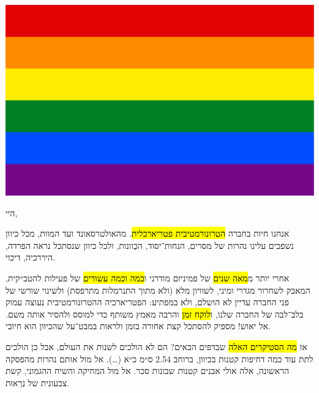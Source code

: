 



\color{magenta}
\setRL{}
\includegraphics[width=\textwidth, height=1ex]{flag.eps}

\vspace{0.5cm}

{
\large
\setlength{\parindent}{0cm}
\setlength{\parskip}{0.5cm}

היי,

אנחנו חיות בחברה \hl{הטרונורמטיבית פטריארכלית}. מהאולטרסאונד ועד המוות, מכל כיוון נשפכים עלינו נהרות של מסרים, הנחות־יסוד, הכְוונות, ולכל כיוון שנסתכל נראה הפרדה, היררכיה, דיכוי.

אחרי יותר מ\hl{מאה שנים} של פמיניזם מודרני ו\hl{כמה וכמה עשורים} של פעילות להטב״קית, המאבק לשחרור מגדרי ומיני, לשוויון מלא (ולא מתוך התנרמלות מתרפסת) ולשינוי שורשי של פני החברה עדיין לא הושלם, ולא במפתיע: הפטריארכיה ההטרונורמטיבית נעוצה עמוק בלב־לבה של החברה שלנו, ו\hl{לוקח זמן} והרבה מאמץ משותף כדי למוסס ולהסיר אותה משם. אל יאוש! מספיק להסתכל קצת אחורה בזמן ולראות במבט־על שהכיוון הוא חיובי.

אז \hl{מה הסטיקרים האלה} שבדפים הבאים? הם לא הולכים לשנות את העולם, אבל כן הולכים לתת עוד כמה דחיפות קטנות בכיוון, ברוחב 2.54 ס״מ כ״א (…). אל מול אותם נהרות מהפסקה הראשונה, אלה אולי אבנים קטנות שבונות סכר. אל מול המחיקה והשיח ההגמוני, קשת צבעונית של נִרְאוּת.

\flagline

}
